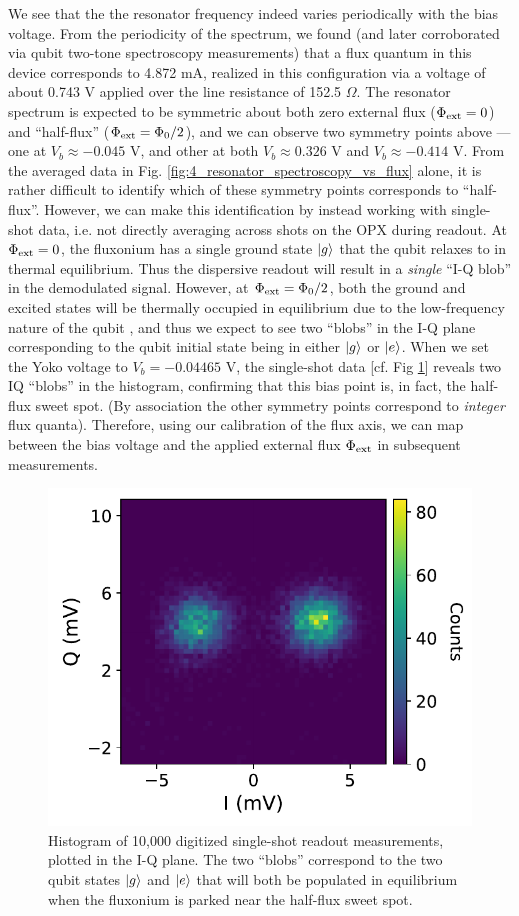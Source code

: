 We see that the the resonator frequency indeed varies periodically with the bias voltage. From the periodicity of the spectrum, we found (and later corroborated via qubit two-tone spectroscopy measurements) that a flux quantum in this device corresponds to 4.872 mA, realized in this configuration via a voltage of about 0.743 V applied over the line resistance of 152.5 $\Omega$. The resonator spectrum is expected to be symmetric about both zero external flux ($\Phi_{\rm ext} = 0$) and ``half-flux'' ($\Phi_{\rm ext} = \Phi_0/2$), and we can observe two symmetry points above --- one at $V_b \approx -0.045$ V, and other at both $V_b \approx 0.326$ V and $V_b \approx -0.414$ V. From the averaged data in Fig. \ref{fig:4_resonator_spectroscopy_vs_flux} alone, it is rather difficult to identify which of these symmetry points corresponds to ``half-flux''. However, we can make this identification by instead working with single-shot data, i.e. not directly averaging across shots on the OPX during readout. At $\Phi_{\rm ext} = 0$, the fluxonium has a single ground state $\lvert g\rangle$ that the qubit relaxes to in thermal equilibrium. Thus the dispersive readout will result in a \textit{single} ``I-Q blob'' in the demodulated signal. However, at $\Phi_{\rm ext} = \Phi_0/2$, both the ground and excited states will be thermally occupied in equilibrium due to the low-frequency nature of the qubit \cite{manenti2023quantum}, and thus we expect to see two ``blobs'' in the I-Q plane corresponding to the qubit initial state being in either $\lvert g\rangle$ or $\lvert e\rangle$. When we set the Yoko voltage to $V_b = -0.04465$ V, the single-shot data [cf. Fig \ref{fig:4_single_shots}] reveals two IQ ``blobs'' in the histogram, confirming that this bias point is, in fact, the half-flux sweet spot. (By association the other symmetry points correspond to \textit{integer} flux quanta). Therefore, using our calibration of the flux axis, we can map between the bias voltage and the applied external flux $\Phi_{\rm ext}$ in subsequent measurements. 

\begin{figure}[h]
    \centering
    \includegraphics[width=0.6\linewidth]{Figures/4/single_shots.pdf}
    \caption{Histogram of 10,000 digitized single-shot readout measurements, plotted in the I-Q plane. The two ``blobs'' correspond to the two qubit states $\lvert g\rangle$ and $\lvert e\rangle$ that will both be populated in equilibrium when the fluxonium is parked near the half-flux sweet spot.}
\label{fig:4_single_shots}
\end{figure}


